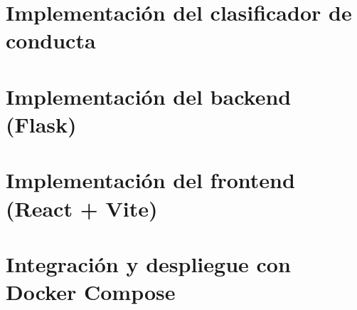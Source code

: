 
\section{Implementaci\'{o}n del clasificador de conducta}

\section{Implementaci\'{o}n del backend (Flask)}

\section{Implementaci\'{o}n del frontend (React + Vite)}

\section{Integraci\'{o}n y despliegue con Docker Compose}
